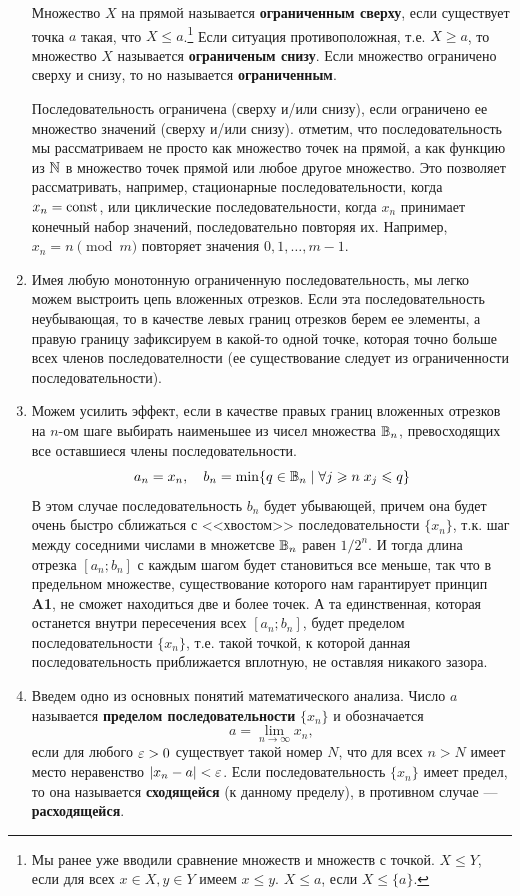 \begin{enumerate}
Множество $X$ на прямой называется \textbf{ограниченным сверху}, если существует точка $a$ такая, что $X\le a$.\footnote{Мы ранее уже вводили сравнение множеств и множеств с точкой. $X\le Y$, если для всех $x\in X,y\in Y$ имеем $x\le y$. $X\le a$, если $X\le\{a\}$. } Если ситуация противоположная, т.е. $X\ge a$, то множество $X$ называется \textbf{ограниченым снизу}. Если множество ограничено сверху и снизу, то но называется \textbf{ограниченным}.

Последовательность ограничена (сверху и/или снизу), если ограничено ее множество значений (сверху и/или снизу). отметим, что последовательность мы рассматриваем не просто как множество точек на прямой, а как функцию из $\mathbb N$ в множество точек прямой или любое другое множество. Это позволяет рассматривать, например, стационарные последовательности, когда $x_n=\mathrm{const}$, или циклические последовательности, когда $x_n$ принимает конечный набор значений, последовательно повторяя их. Например, $x_n=n\pmod m$ повторяет значения $0,1,\dots,m-1$.

\item Имея любую монотонную ограниченную последовательность, мы легко можем выстроить цепь вложенных отрезков. Если эта последовательность неубывающая, то в качестве левых границ отрезков берем ее элементы, а правую границу зафиксируем в какой-то одной точке, которая точно больше всех членов последователности (ее существование следует из ограниченности последовательности).
\item Можем усилить эффект, если в качестве правых границ вложенных отрезков на $n$-ом шаге выбирать наименьшее из чисел множества $\mathbb B_n$, превосходящих все оставшиеся члены последовательности.
$$
a_n=x_n,\quad b_n=\min\{q\in\mathbb B_n\mid \forall j\geqslant n\;x_j\leqslant q\}
$$
В этом случае последовательность $b_n$ будет убывающей, причем она будет очень быстро сближаться с <<хвостом>> последовательности $\{x_n\}$, т.к. шаг между соседними числами в множетсве $\mathbb B_n$ равен $1/2^n$. И тогда длина отрезка $[a_n;b_n]$ с каждым шагом будет становиться все меньше, так что в предельном множестве, существование которого нам гарантирует принцип \textbf{A1}, не сможет находиться две и более точек. А та единственная, которая останется внутри пересечения всех $[a_n;b_n]$, будет пределом последовательности $\{x_n\}$, т.е. такой точкой, к которой данная последовательность приближается вплотную, не оставляя никакого зазора.
\item Введем одно из основных понятий математического анализа. Число $a$ называется \textbf{пределом последовательности} $\{x_n\}$ и обозначается
$$
a = \lim_{n\to\infty}x_n,
$$
если для любого $\varepsilon>0$ существует такой номер $N$, что для всех $n>N$ имеет место неравенство $|x_n-a|<\varepsilon$. Если последовательность $\{x_n\}$ имеет предел, то она называется \textbf{сходящейся} (к данному пределу), в противном случае --- \textbf{расходящейся}.


\end{enumerate}
